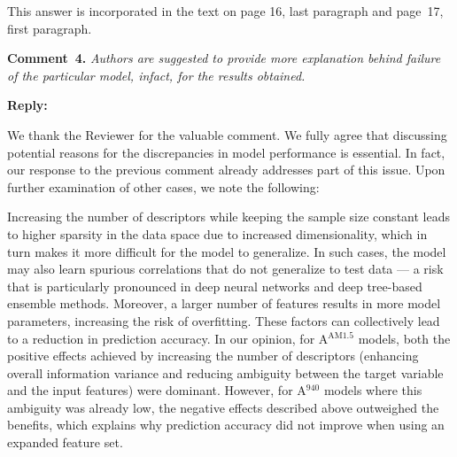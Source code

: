 \documentclass[a4paper,fleqn]{cas-sc}
\begin{document}
This answer is incorporated in the text on page 16, last paragraph and page~17, first paragraph.


\textcolor[rgb]{1.00,0.07,0.00}{
\hl{}}


\vspace{1cm}
\noindent
\textcolor[rgb]{0.00,0.50,1.00}{\textbf{Comment~4.}}
\emph{Authors are suggested to provide more explanation behind failure of the particular model, infact, for the results obtained.}

\noindent
\textcolor[rgb]{0.51,0.00,0.00}{\textbf{Reply:}}

We thank the Reviewer for the valuable comment.
We fully agree that discussing potential reasons for the discrepancies in model performance is essential. 
In fact, our response to the previous comment already addresses part of this issue.
Upon further examination of other cases, we note the following:



Increasing the number of descriptors while keeping the sample size constant leads
to higher sparsity in the data space due to increased dimensionality,
which in turn makes it more difficult for the model to generalize.
In such cases, the model may also learn spurious correlations that do not generalize to test data ---
a risk that is particularly pronounced in deep neural networks and  deep tree-based ensemble methods.
Moreover, a larger number of features results in more model parameters, increasing the risk of overfitting.
These factors can collectively lead to a reduction in prediction accuracy.
In our opinion, for A$^\mathrm{AM1.5}$ models, both the positive effects achieved by increasing the number of descriptors
(enhancing overall information variance and reducing ambiguity between the target variable and the input features) were dominant.
However, for A$^\mathrm{940}$ models where this ambiguity was already low,
the negative effects described above outweighed the benefits,
which explains why prediction accuracy did not improve when using an expanded feature set.
\end{document}
